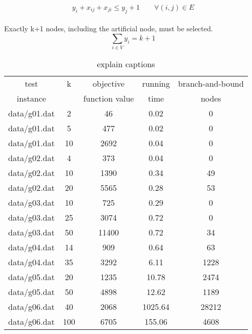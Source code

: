 \begin{equation}
 y_{i} + x_{ij} + x_{ji} \leq y_{j} + 1 \qquad \forall (i,j) \in E
 \label{lbl:xy3}
\end{equation}
\\
Exactly k+1 nodes, including the artificial node, must be selected.
\begin{equation}
  \sum_{i \in V} y_i = k + 1
  \label{lbl:yk}
\end{equation}


\begin{table} 
\small
\centering
\begin{tabular}{ccccc}
\hline
test     & k & objective      & running & branch-and-bound \\
instance &   & function value & time    & nodes \\
\hline
data/g01.dat		&2	&46	&0.02	&0	\\ 
data/g01.dat		&5	&477	&0.02	&0	\\ 
data/g01.dat		&10	&2692	&0.04	&0	\\ 
data/g02.dat		&4	&373	&0.04	&0	\\ 
data/g02.dat		&10	&1390	&0.34	&49	\\ 
data/g02.dat		&20	&5565	&0.28	&53	\\ 
data/g03.dat		&10	&725	&0.29	&0	\\ 
data/g03.dat		&25	&3074	&0.72	&0	\\ 
data/g03.dat		&50	&11400	&0.72	&34	\\ 
data/g04.dat		&14	&909	&0.64	&63	\\ 
data/g04.dat		&35	&3292	&6.11	&1228	\\ 
data/g05.dat		&20	&1235	&10.78	&2474	\\ 
data/g05.dat		&50	&4898	&12.62	&1189	\\ 
data/g06.dat		&40	&2068	&1025.64	&28212	\\ 
data/g06.dat		&100	&6705	&155.06	&4608	\\

\hline
\end{tabular}
\caption{explain captions}
\label{tbl:scf_fast}
\end{table}

